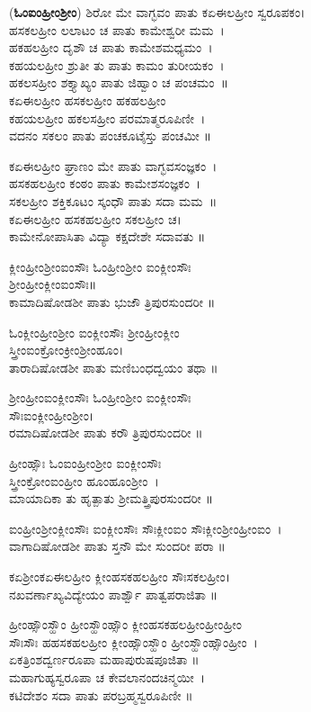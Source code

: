 ({\bfseries ಓಂಐಂಹ್ರೀಂಶ್ರೀಂ}) ಶಿರೋ ಮೇ ವಾಗ್ಭವಂ ಪಾತು ಕಏಈಲಹ್ರೀಂ ಸ್ವರೂಪಕಂ।\\
ಹಸಕಲಹ್ರೀಂ ಲಲಾಟಂ ಚ ಪಾತು ಕಾಮೇಶ್ವರೀ ಮಮ~।\\
ಹಕಹಲಹ್ರೀಂ ದೃಶೌ ಚ ಪಾತು ಕಾಮೇಶಮಧ್ಯಮಂ~।\\
ಕಹಯಲಹ್ರೀಂ ಶ್ರುತೀ ತು ಪಾತು ಕಾಮಂ ತುರೀಯಕಂ~।\\
ಹಕಲಸಹ್ರೀಂ ಶಕ್ತ್ಯಾಖ್ಯಂ ಪಾತು ಜಿಹ್ವಾಂ ಚ ಪಂಚಮಂ~॥\\
ಕಏಈಲಹ್ರೀಂ ಹಸಕಲಹ್ರೀಂ ಹಕಹಲಹ್ರೀಂ\\
ಕಹಯಲಹ್ರೀಂ ಹಕಲಸಹ್ರೀಂ  ಪರಮಾತ್ಮರೂಪಿಣೀ~।\\
ವದನಂ ಸಕಲಂ ಪಾತು ಪಂಚಕೂಟೈಸ್ತು ಪಂಚಮೀ ॥

ಕಏಈಲಹ್ರೀಂ ಘ್ರಾಣಂ ಮೇ ಪಾತು ವಾಗ್ಭವಸಂಜ್ಞಕಂ~।\\
ಹಸಕಹಲಹ್ರೀಂ ಕಂಠಂ ಪಾತು ಕಾಮೇಶಸಂಜ್ಞಕಂ~।\\
ಸಕಲಹ್ರೀಂ ಶಕ್ತಿಕೂಟಂ ಸ್ಕಂಧೌ ಪಾತು ಸದಾ ಮಮ~॥\\
ಕಏಈಲಹ್ರೀಂ ಹಸಕಹಲಹ್ರೀಂ ಸಕಲಹ್ರೀಂ ಚ।\\
ಕಾಮೇನೋಪಾಸಿತಾ ವಿದ್ಯಾ ಕಕ್ಷದೇಶೇ ಸದಾವತು ॥

ಕ್ಲೀಂಹ್ರೀಂಶ್ರೀಂಐಂಸೌಃ ಓಂಹ್ರೀಂಶ್ರೀಂ ಐಂಕ್ಲೀಂಸೌಃ\\ ಶ್ರೀಂಹ್ರೀಂಕ್ಲೀಂಐಂಸೌಃ॥\\
ಕಾಮಾದಿಷೋಡಶೀ ಪಾತು ಭುಜೌ ತ್ರಿಪುರಸುಂದರೀ ॥

ಓಂಕ್ಲೀಂಹ್ರೀಂಶ್ರೀಂ ಐಂಕ್ಲೀಂಸೌಃ  ಶ್ರೀಂಹ್ರೀಂಕ್ಲೀಂ\\ ಸ್ತ್ರೀಂಐಂಕ್ರೋಂಕ್ರೀಂಶ್ರೀಂಹೂಂ।\\
ತಾರಾದಿಷೋಡಶೀ ಪಾತು ಮಣಿಬಂಧದ್ವಯಂ ತಥಾ ॥

ಶ್ರೀಂಹ್ರೀಂಐಂಕ್ಲೀಂಸೌಃ ಓಂಹ್ರೀಂಶ್ರೀಂ ಐಂಕ್ಲೀಂಸೌಃ\\ ಸೌಃಐಂಕ್ಲೀಂಹ್ರೀಂಶ್ರೀಂ।\\
ರಮಾದಿಷೋಡಶೀ ಪಾತು ಕರೌ ತ್ರಿಪುರಸುಂದರೀ ॥

ಹ್ರೀಂಹ್ಸೌಃ ಓಂಐಂಹ್ರೀಂಶ್ರೀಂ ಐಂಕ್ಲೀಂಸೌಃ \\ಸ್ತ್ರೀಂಕ್ರೋಂಐಂಹ್ರೀಂ ಹೂಂಹೂಂಶ್ರೀಂ~।\\
ಮಾಯಾದಿಕಾ ತು ಹೃತ್ಪಾತು ಶ್ರೀಮತ್ತ್ರಿಪುರಸುಂದರೀ ॥

ಐಂಹ್ರೀಂಶ್ರೀಂಕ್ಲೀಂಸೌಃ ಐಂಕ್ಲೀಂಸೌಃ ಸೌಃಕ್ಲೀಂಐಂ ಸೌಃಕ್ಲೀಂಶ್ರೀಂಹ್ರೀಂಐಂ~।\\
ವಾಗಾದಿಷೋಡಶೀ ಪಾತು ಸ್ತನೌ ಮೇ ಸುಂದರೀ ಪರಾ ॥

ಕಏಶ್ರೀಂಕಏಈಲಹ್ರೀಂ ಕ್ಲೀಂಹಸಕಹಲಹ್ರೀಂ ಸೌಃಸಕಲಹ್ರೀಂ।\\
ನಖವರ್ಣಾಖ್ಯವಿದ್ಯೇಯಂ ಪಾರ್ಶ್ವೌ ಪಾತ್ವಪರಾಜಿತಾ ॥

ಹ್ರೀಂಹ್ಸೌಂಸ್ಹೌಂ ಹ್ರೀಂಸ್ಹೌಂಹ್ಸೌಂ ಕ್ಲೀಂಹಸಕಹಲಹ್ರೀಂಹ್ರೀಂಹ್ರೀಂ\\ ಸೌಃಸೌಃ ಹಹಸಕಹಲಹ್ರೀಂ ಕ್ಲೀಂಹ್ಸೌಂಸ್ಹೌಂ ಹ್ರೀಂಸ್ಹೌಂಹ್ಸೌಂಹ್ರೀಂ~।\\
ಏಕತ್ರಿಂಶದ್ವರ್ಣರೂಪಾ ಮಹಾಪುರುಷಪೂಜಿತಾ ॥\\
ಮಹಾಗುಹ್ಯಸ್ವರೂಪಾ ಚ ಕೇವಲಾನಂದಚಿನ್ಮಯೀ~।\\
ಕಟಿದೇಶಂ ಸದಾ ಪಾತು ಪರಬ್ರಹ್ಮಸ್ವರೂಪಿಣೀ ॥

